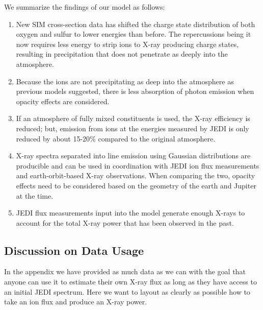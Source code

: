 \documentclass[draft]{agujournal2018}
\begin{document}
We summarize the findings of our model as follows:
\begin{enumerate}
    \item New SIM cross-section data has shifted the charge state distribution of both oxygen and sulfur to lower energies than before.
    The repercussions being it now requires less energy to strip ions to X-ray producing charge states, resulting in precipitation that does not penetrate as deeply into the atmosphere.
    \item Because the ions are not precipitating as deep into the atmosphere as previous models suggested, there is less absorption of photon emission when opacity effects are considered.
    \item If an atmosphere of fully mixed constituents is used, the X-ray efficiency is reduced; but, emission from ions at the energies measured by JEDI is only reduced by about 15-20$\%$ compared to the original atmosphere.
    \item X-ray spectra separated into line emission using Gaussian distributions are producible and can be used in coordination with JEDI ion flux measurements and earth-orbit-based X-ray observations.
    When comparing the two, opacity effects need to be considered based on the geometry of the earth and Jupiter at the time.
    \item JEDI flux measurements input into the model generate enough X-rays to account for the total X-ray power that has been observed in the past.
\end{enumerate}

\subsection{Discussion on Data Usage}

In the appendix we have provided as much data as we can with the goal that anyone can use it to estimate their own X-ray flux as long as they have access to an initial JEDI spectrum.
Here we want to layout as clearly as possible how to take an ion flux and produce an X-ray power.
\end{document}

